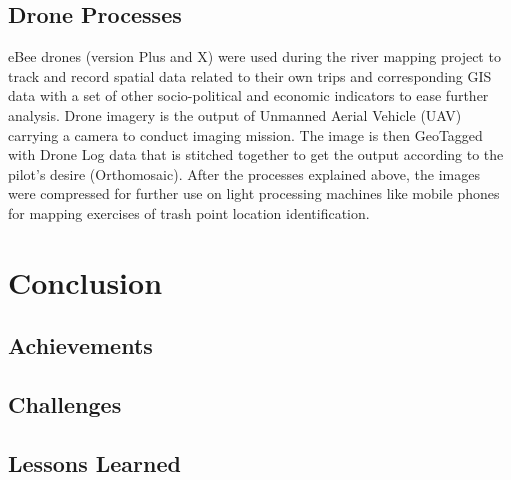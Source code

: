 \documentclass[a4paper,12pt,twoside]{article}
\begin{document}
\subsection{Drone Processes}

    \begin{multicols}{2}
    eBee drones (version Plus and X) were used during the river mapping project to track and record spatial data related to their own trips and corresponding GIS data with a set of other socio-political and economic indicators to ease further analysis. Drone imagery is the output of Unmanned Aerial Vehicle (UAV) carrying a camera to conduct imaging mission. The image is then GeoTagged with Drone Log data that is stitched together to get the output according to the pilot’s desire (Orthomosaic). After the processes explained above, the images were compressed for further use on light processing machines like mobile phones for mapping exercises of trash point location identification.
    \end{multicols}
    
    

\section{Conclusion}

\begin{multicols}{2}
\lipsum[0-5]
\end{multicols}

\subsection{Achievements}

\begin{multicols}{2}
\lipsum[0-5]
\end{multicols}

\subsection{Challenges}

\begin{multicols}{2}
\lipsum[0-5]
\end{multicols}

\subsection{Lessons Learned}

\begin{multicols}{2}
\lipsum[0-5]
\end{multicols}
\end{document}
